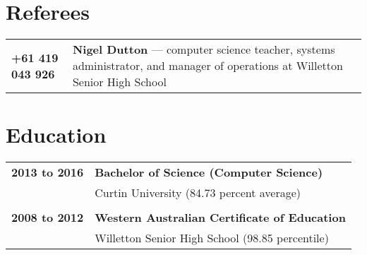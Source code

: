 \documentclass[a4paper,12pt]{article}
\begin{document}

\newpage

\section*{Referees}

\begin{tabular}{p{35mm}p{125mm}}
	                    \textbf{+61 419 043 926}    & \textbf{Nigel Dutton} --- computer science teacher, systems administrator, and manager of operations at Willetton Senior High School
\end{tabular}

\section*{Education}

\begin{tabular}{p{35mm}p{125mm}}
	                    \textbf{2013 to 2016}       & \textbf{Bachelor of Science (Computer Science)}
	\vspace{0.2em}  \\                              & Curtin University (84.73 percent average)
	\\              \\  \textbf{2008 to 2012}       & \textbf{Western Australian Certificate of Education}
	\vspace{0.2em}  \\                              & Willetton Senior High School (98.85 percentile)
\end{tabular}
\end{document}
